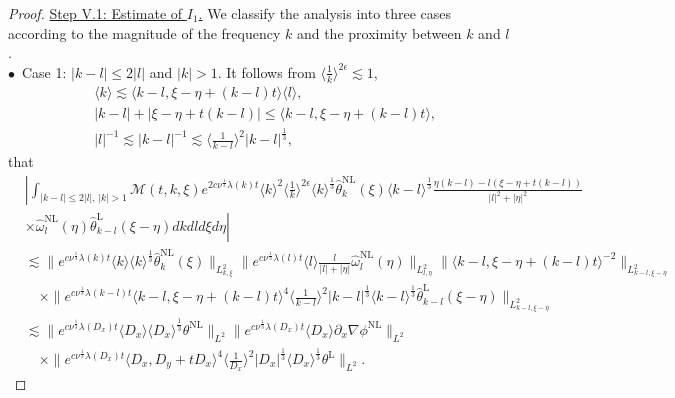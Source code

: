 \documentclass[reqno, 12pt]{amsart} %
\theoremstyle{plain} %
\theoremstyle{definition}
\theoremstyle{remark}
\numberwithin{equation}{section} %
\newcommand{\no}{\nonumber}
\newcommand{\lt}{\left}
\newcommand{\rt}{\right}
\begin{document}
\begin{proof}
		\underline{ Step V.1: Estimate of $I_1$.}       
		We classify the analysis into three cases according to the magnitude of the frequency $k$ and the proximity between $k$ and $l$. \\
		$\bullet$~Case 1:   $|k-l| \leq 2|l|$ and $|k|>1$.  It follows from $\langle \frac1k \rangle^{2\epsilon} \lesssim 1$, 
		\begin{align}
			&\langle k \rangle \lesssim \langle k-l, \xi-\eta+(k-l) t\rangle \langle l \rangle, \label{eq:trick4}\\
			& |k-l|+|\xi-\eta+t(k-l)| \leq\langle k-l, \xi-\eta+(k-l) t\rangle, \label{eq:trick5}\\
			& |l|^{-1} \lesssim |k-l|^{-1} \lesssim \langle\frac{1}{k-l}\rangle^2 |k-l|^{\frac{1}{3}} \label{eq:trick6},
		\end{align}
		that
		\begin{align} \label{eq:temp27}
			\no& \left| \int_{|k-l| \leq 2|l|,\,|k|>1} \mathcal{M}(t, k, \xi) e^{2 c \nu^{\frac{1}{3}} \lambda(k) t}\langle k\rangle^2\langle\frac{1}{k}\rangle^{2 \epsilon} \langle k \rangle^\frac13\hat{\theta}_k^{\mathrm{NL}}(\xi) \langle k-l \rangle^\frac13  \frac{\eta(k-l)-l(\xi-\eta+t(k-l))}{|l|^2+|\eta|^2}\right.\\\no
			& \lt. \times \hat{\omega}_l^{\mathrm{NL}}(\eta) \hat{\theta}_{k-l}^{\mathrm{L}}(\xi-\eta) d k d l d \xi d \eta \rt| \\\nonumber
			& \lesssim\|e^{c \nu^{\frac{1}{3}} \lambda(k) t}\langle k\rangle \langle k \rangle^\frac13  \hat{\theta}_k^{\mathrm{NL}}(\xi)\|_{L_{k, \xi}^2}\|e^{c \nu^{\frac{1}{3}} \lambda(l) t}\langle l\rangle \frac{l}{|l|+|\eta|} \hat{\omega}_l^{\mathrm{NL}}(\eta)\|_{L_{l, \eta}^2}\|\langle k-l, \xi-\eta+(k-l) t\rangle^{-2}\|_{L_{k-l, \xi-\eta}^2} \\\no
			& \quad \times\|e^{c \nu^{\frac{1}{3}} \lambda(k-l) t}\langle k-l, \xi-\eta+(k-l) t\rangle^4\langle\frac{1}{k-l}\rangle^2|k-l|^{\frac{1}{3}} \langle k-l \rangle^\frac13 \hat{\theta}_{k-l}^{\mathrm{L}}(\xi-\eta)\|_{L_{k-l, \xi-\eta}^2} \\\no
			& \lesssim   \|e^{c \nu^{\frac{1}{3}} \lambda\left(D_x\right) t}\langle D_x\rangle  \langle D_x \rangle^\frac13  \theta^{\mathrm{NL}}\|_{L^2}\|e^{c \nu^{\frac{1}{3}} \lambda\left(D_x\right) t}\langle D_x\rangle \partial_x \nabla \phi^{\mathrm{NL}}\|_{L^2} \\
			& \quad \times\|e^{c \nu^{\frac{1}{3}} \lambda\left(D_x\right) t}\langle D_x, D_y+t D_x\rangle^4\langle\frac{1}{D_x}\rangle^2\left|D_x\right|^{\frac{1}{3}}  \langle D_x \rangle^\frac13  \theta^{\mathrm{L}}\|_{L^2}.

\end{align}
\end{proof}
\end{document}
